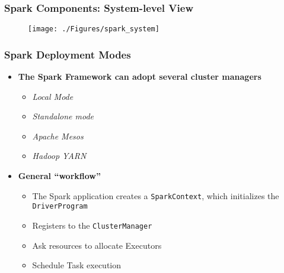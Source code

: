 \begin{frame}
\frametitle{Spark Components: System-level View}
	\begin{figure}[h]
	  \centering
	  \texttt{[image: ./Figures/spark\_system]}
	  \label{fig:spark_components}
	\end{figure}
\end{frame}

\begin{frame}
\frametitle{Spark Deployment Modes}
\begin{itemize}
	\item {\bf The Spark Framework can adopt several cluster managers}
	\begin{itemize}
		\item \emph{Local Mode}
		\item \emph{Standalone mode}
		\item \emph{Apache Mesos}
		\item \emph{Hadoop YARN}
	\end{itemize}

	\vspace{20pt}

	\item {\bf General ``workflow''}
	\begin{itemize}
		\item The Spark application creates a \texttt{SparkContext}, which initializes the \texttt{DriverProgram}
		\item Registers to the \texttt{ClusterManager}
		\item Ask resources to allocate Executors
		\item Schedule Task execution
	\end{itemize}
\end{itemize}
\end{frame}

